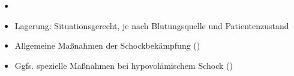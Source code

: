 %
\label{m:blutung-verdauungstrakt}%
\begin{itemize}
  \item \TxMassVitMK
    \item Lagerung:
    Situationsgerecht, je nach Blutungsquelle und
    Patientenzustand
  \item Allgemeine Maßnahmen der Schockbekämpfung
  ()
  \item Ggfs. spezielle Maßnahmen bei hypovolämischem Schock
  ()
\end{itemize}